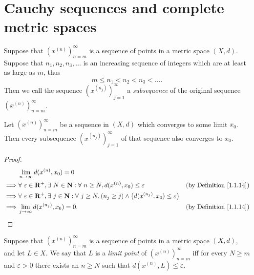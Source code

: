 \section{Cauchy sequences and complete metric spaces}\label{sec 1.4}

\begin{definition}[Subsequences]\label{1.4.1}
    Suppose that \((x^{(n)})_{n = m}^\infty\) is a sequence of points in a metric space \((X, d)\).
    Suppose that \(n_1, n_2, n_3, \dots\) is an increasing sequence of integers which are at least as large as \(m\), thus
    \[
        m \leq n_1 < n_2 < n_3 < \dots.
    \]
    Then we call the sequence \((x^{(n_j)})_{j = 1}^\infty\) a \emph{subsequence} of the original sequence \((x^{(n)})_{n = m}^\infty\).
\end{definition}

\setcounter{theorem}{2}
\begin{lemma}\label{1.4.3}
    Let \((x^{(n)})_{n = m}^\infty\) be a sequence in \((X, d)\) which converges to some limit \(x_0\).
    Then every subsequence \((x^{(n_j)})_{j = 1}^\infty\) of that sequence also converges to \(x_0\).
\end{lemma}

\begin{proof}
    \begin{align*}
                 & \lim_{n \to \infty} d(x^{(n)}, x_0) = 0                                                                                                                                                     \\
        \implies & \forall\ \varepsilon \in \mathbf{R}^+, \exists\ N \in \mathbf{N} : \forall\ n \geq N, d(x^{(n)}, x_0) \leq \varepsilon                                & \text{(by Definition \ref{1.1.14})} \\
        \implies & \forall\ \varepsilon \in \mathbf{R}^+, \exists\ j \in \mathbf{N} : \forall\ j \geq N, (n_j \geq j) \land \big(d(x^{(n_j)}, x_0) \leq \varepsilon\big)                                       \\
        \implies & \lim_{j \to \infty} d(x^{(n_j)}, x_0) = 0.                                                                                                            & \text{(by Definition \ref{1.1.14})}
    \end{align*}
\end{proof}

\begin{definition}\label{1.4.4}
    Suppose that \((x^{(n)})_{n = m}^\infty\) is a sequence of points in a metric space \((X, d)\), and let \(L \in X\).
    We say that \(L\) is a \emph{limit point} of \((x^{(n)})_{n = m}^\infty\) iff for every \(N \geq m\) and \(\varepsilon > 0\) there exists an \(n \geq N\) such that \(d(x^{(n)}, L) \leq \varepsilon\).
\end{definition}

